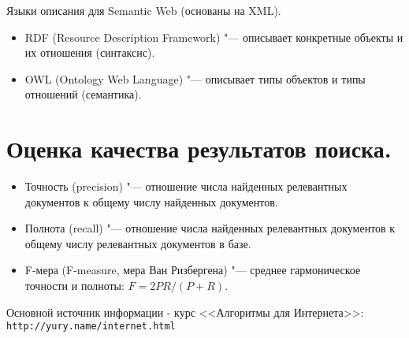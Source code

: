 \documentclass[a4paper,12pt]{article}
\begin{document}
Языки описания для Semantic Web (основаны на XML).
\begin{itemize}
\item RDF (Resource Description Framework) "--- описывает
конкретные объекты и их отношения (синтаксис).
\item OWL (Ontology Web Language) "--- описывает
типы объектов и типы отношений (семантика).
\end{itemize}


\section{Оценка качества результатов поиска.}

\begin{itemize}
\item Точность (precision) "--- отношение числа найденных релевантных
документов к общему числу найденных документов.
\item Полнота (recall) "--- отношение числа найденных релевантных
документов к общему числу релевантных документов в базе.
\item F-мера (F-measure, мера Ван Ризбергена) "--- среднее
гармоническое точности и полноты: $F=2PR/(P+R)$.
\end{itemize}


\bigskip
Основной источник информации - курс <<Алгоритмы для Интернета>>:
\texttt{http://yury.name/internet.html}
\end{document}
